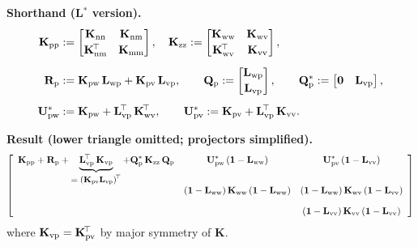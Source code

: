 \medskip

\noindent\textbf{Shorthand (L$^{*}$ version).}
\[
\begin{aligned}
\mathbf{K}_{\mathrm{pp}} &:= 
\begin{bmatrix}\mathbf K_{\rm nn} & \mathbf K_{\rm nm}\\[2pt] \mathbf K_{\rm nm}^{\!\top} & \mathbf K_{\rm mm}\end{bmatrix},\quad
\mathbf K_{\mathrm{zz}} :=
\begin{bmatrix}\mathbf K_{\rm ww} & \mathbf K_{\rm wv}\\[2pt] \mathbf K_{\rm wv}^{\!\top} & \mathbf K_{\rm vv}\end{bmatrix},\\[4pt]
\mathbf R_{\mathrm p} &:= \mathbf K_{\rm pw}\,\mathbf L_{\rm wp}+\mathbf K_{\rm pv}\,\mathbf L_{\rm vp},
\qquad
\mathbf Q_{\mathrm p} := \begin{bmatrix}\mathbf L_{\rm wp}\\[2pt]\mathbf L_{\rm vp}\end{bmatrix},
\qquad
\mathbf Q_{\mathrm p}^{*} := \begin{bmatrix}
\mathbf{0} & \mathbf L_{\rm vp}
\end{bmatrix},\\[4pt]
\mathbf U_{\mathrm{pw}}^{*} &:= \mathbf K_{\rm pw}+\mathbf L_{\rm vp}^{\!\top}\,\mathbf K_{\rm wv}^{\!\top},\qquad
\mathbf U_{\mathrm{pv}}^{*} := \mathbf K_{\rm pv}+\mathbf L_{\rm vp}^{\!\top}\,\mathbf K_{\rm vv}.
\end{aligned}
\]

\medskip

\noindent\textbf{Result (lower triangle omitted; projectors simplified).}
\[
\left[
\begin{array}{ccc}
\displaystyle
\mathbf K_{\mathrm{pp}}
+ \mathbf R_{\mathrm p}
+ \underbrace{\mathbf L_{\rm vp}^{\!\top}\,\mathbf K_{\rm vp}}_{\text{\small \(=(\mathbf K_{\rm pv}\mathbf L_{\rm vp})^{\!\top}\)}}
+ \mathbf Q_{\mathrm p}^{*}\,\mathbf K_{\mathrm{zz}}\,\mathbf Q_{\mathrm p}
&
\displaystyle
\mathbf U_{\mathrm{pw}}^{*}\,(\mathbf{1}-\mathbf L_{\rm ww})
&
\displaystyle
\mathbf U_{\mathrm{pv}}^{*}\,(\mathbf{1}-\mathbf L_{\rm vv})
\\[10pt]
&
\displaystyle
(\mathbf{1}-\mathbf L_{\rm ww})\,\mathbf K_{\rm ww}\,(\mathbf{1}-\mathbf L_{\rm ww})
&
\displaystyle
(\mathbf{1}-\mathbf L_{\rm ww})\,\mathbf K_{\rm wv}\,(\mathbf{1}-\mathbf L_{\rm vv})
\\[10pt]
&
&
\displaystyle
(\mathbf{1}-\mathbf L_{\rm vv})\,\mathbf K_{\rm vv}\,(\mathbf{1}-\mathbf L_{\rm vv})
\end{array}
\right]
\]
where
\(
\mathbf K_{\rm vp}=\mathbf K_{\rm pv}^{\!\top}
\)
by major symmetry of \(\mathbf K\).


